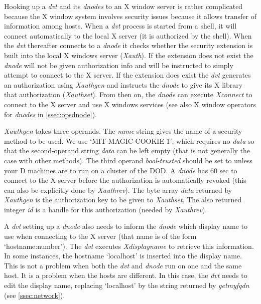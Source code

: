 
Hooking up a \emph{dvt} and its \emph{dnodes} to an X window server is rather complicated because the X window system involves security issues because it allows transfer of information among hosts. When a \emph{dvt} process is started from a shell, it will connect automatically to the local X server (it is authorized by the shell). When the \emph{dvt} thereafter connects to a \emph{dnode} it checks whether the security extension is built into the local X windows server (\emph{Xauth}). If the extension does not exist the \emph{dnode} will not be given authorization info and will be instructed to simply attempt to connect to the X server. If the extension does exist the \emph{dvt} generates an authorization using \emph{Xauthgen} and instructs the \emph{dnode} to give its X library that authorization (\emph{Xauthset}). From then on, the \emph{dnode} can execute \emph{Xconnect} to connect to the X server and use X windows services (see also X window operators for \emph{dnodes} in \ref{ssec:opsdnode}).

\emph{Xauthgen} takes three operands. The \emph{name} string gives the name of a security method to be used. We use `MIT-MAGIC-COOKIE-1', which requires no \emph{data} so that the second-operand string \emph{data} can be left empty (that is not generally the case with other methods). The third operand \emph{bool-trusted} should be set to  unless your D machines are to run on a cluster of the DOD. A \emph{dnode} has 60 sec to connect to the X server before the authorization is automatically revoked (this can also be explicitly done by \emph{Xauthrev}). The byte array \emph{data} returned by \emph{Xauthgen} is the authorization key to be given to \emph{Xauthset}. The also returned integer \emph{id} is a handle for this authorization (needed by \emph{Xauthrev}).

A \emph{dvt} setting up a \emph{dnode} also needs to inform the \emph{dnode} which display name to use when connecting to the X server (that name is of the form `hostname:number'). The \emph{dvt} executes \emph{Xdisplayname} to retrieve this information. In some instances, the hostname `localhost' is inserted into the display name. This is not a problem when both the \emph{dvt} and \emph{dnode} run on one and the same host. It is a problem when the hosts are different. In this case, the \emph{dvt} needs to edit the display name, replacing `localhost' by the string returned by \emph{getmyfqdn} (see \ref{ssec:network}). 

